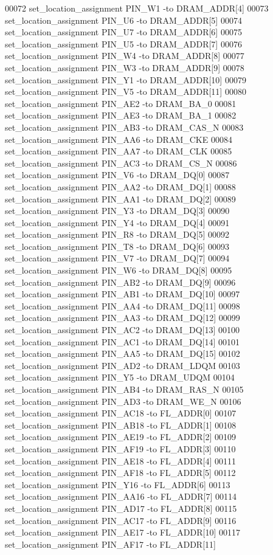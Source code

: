 \begin{DoxyCode}
00072 set\_location\_assignment PIN\_W1 -to DRAM\_ADDR[4]
00073 set\_location\_assignment PIN\_U6 -to DRAM\_ADDR[5]
00074 set\_location\_assignment PIN\_U7 -to DRAM\_ADDR[6]
00075 set\_location\_assignment PIN\_U5 -to DRAM\_ADDR[7]
00076 set\_location\_assignment PIN\_W4 -to DRAM\_ADDR[8]
00077 set\_location\_assignment PIN\_W3 -to DRAM\_ADDR[9]
00078 set\_location\_assignment PIN\_Y1 -to DRAM\_ADDR[10]
00079 set\_location\_assignment PIN\_V5 -to DRAM\_ADDR[11]
00080 set\_location\_assignment PIN\_AE2 -to DRAM\_BA\_0
00081 set\_location\_assignment PIN\_AE3 -to DRAM\_BA\_1
00082 set\_location\_assignment PIN\_AB3 -to DRAM\_CAS\_N
00083 set\_location\_assignment PIN\_AA6 -to DRAM\_CKE
00084 set\_location\_assignment PIN\_AA7 -to DRAM\_CLK
00085 set\_location\_assignment PIN\_AC3 -to DRAM\_CS\_N
00086 set\_location\_assignment PIN\_V6 -to DRAM\_DQ[0]
00087 set\_location\_assignment PIN\_AA2 -to DRAM\_DQ[1]
00088 set\_location\_assignment PIN\_AA1 -to DRAM\_DQ[2]
00089 set\_location\_assignment PIN\_Y3 -to DRAM\_DQ[3]
00090 set\_location\_assignment PIN\_Y4 -to DRAM\_DQ[4]
00091 set\_location\_assignment PIN\_R8 -to DRAM\_DQ[5]
00092 set\_location\_assignment PIN\_T8 -to DRAM\_DQ[6]
00093 set\_location\_assignment PIN\_V7 -to DRAM\_DQ[7]
00094 set\_location\_assignment PIN\_W6 -to DRAM\_DQ[8]
00095 set\_location\_assignment PIN\_AB2 -to DRAM\_DQ[9]
00096 set\_location\_assignment PIN\_AB1 -to DRAM\_DQ[10]
00097 set\_location\_assignment PIN\_AA4 -to DRAM\_DQ[11]
00098 set\_location\_assignment PIN\_AA3 -to DRAM\_DQ[12]
00099 set\_location\_assignment PIN\_AC2 -to DRAM\_DQ[13]
00100 set\_location\_assignment PIN\_AC1 -to DRAM\_DQ[14]
00101 set\_location\_assignment PIN\_AA5 -to DRAM\_DQ[15]
00102 set\_location\_assignment PIN\_AD2 -to DRAM\_LDQM
00103 set\_location\_assignment PIN\_Y5 -to DRAM\_UDQM
00104 set\_location\_assignment PIN\_AB4 -to DRAM\_RAS\_N
00105 set\_location\_assignment PIN\_AD3 -to DRAM\_WE\_N
00106 set\_location\_assignment PIN\_AC18 -to FL\_ADDR[0]
00107 set\_location\_assignment PIN\_AB18 -to FL\_ADDR[1]
00108 set\_location\_assignment PIN\_AE19 -to FL\_ADDR[2]
00109 set\_location\_assignment PIN\_AF19 -to FL\_ADDR[3]
00110 set\_location\_assignment PIN\_AE18 -to FL\_ADDR[4]
00111 set\_location\_assignment PIN\_AF18 -to FL\_ADDR[5]
00112 set\_location\_assignment PIN\_Y16 -to FL\_ADDR[6]
00113 set\_location\_assignment PIN\_AA16 -to FL\_ADDR[7]
00114 set\_location\_assignment PIN\_AD17 -to FL\_ADDR[8]
00115 set\_location\_assignment PIN\_AC17 -to FL\_ADDR[9]
00116 set\_location\_assignment PIN\_AE17 -to FL\_ADDR[10]
00117 set\_location\_assignment PIN\_AF17 -to FL\_ADDR[11]

\end{DoxyCode}
